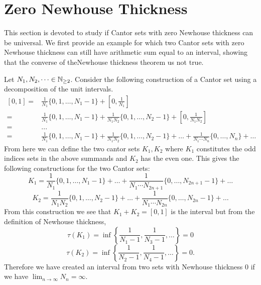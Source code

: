 \newpage
\section{Zero Newhouse Thickness} 
This section is devoted to study  if Cantor sets with zero Newhouse thickness can be universal. We first  provide an example for  which two Cantor sets with zero Newhouse thickness can still have arithmetic sum equal  to an interval,  showing that the converse of theNewhouse thickness theorem us  not true.   %
\begin{example}
{\rm Let $N_1, N_2, \dots \in \mathbb{N}_{\geq 2}$. Consider the following construction of a Cantor set using a decomposition of the unit intervals. }
$$
\begin{aligned}
[0,1] = &\frac{1}{N_1}\{0,1, \dots, N_1-1\} + \left[0,\frac{1}{N_1}\right]\\
 = & \frac{1}{N_1}\{0,1, \dots, N_1-1\} + \frac{1}{N_1 N_2}\{0,1, \dots, N_2-1\} + \left[0,\frac{1}{N_1 N_2}\right]\\
 =&...\\
 =&\frac{1}{N_1}\{0,1, \dots, N_1-1\} +  \frac{1}{N_1 N_2}\{0,1, \dots, N_2-1\} + \dots + \frac{1}{N_1 \cdots N_n} \{0,\dots, N_n \}+ \dots
\end{aligned}
$$
{\rm From here we can define the two cantor sets $K_1, K_2$ where $K_1$ constitutes the odd indices sets in the above summands and $K_2$ has the even one.   This gives the following constructions for the two Cantor sets: }
$$K_1 = \frac{1}{N_1}\{0,1, \dots, N_1-1\}  + \dots + \frac{1}{N_1 \cdots N_{2n+1}} \{0,\dots, N_{2n+1}-1 \}+ \dots$$
$$K_2 = \frac{1}{N_1N_2}\{0,1, \dots, N_2-1\}  + \dots +\frac{1}{N_1 \cdots N_{2n}} \{0,\dots, N_{2n}-1 \}+ \dots$$
{\rm From this construction we see that $K_1 + K_2 = [0,1]$ is the interval but from the definition of Newhouse thickness, }
$$\tau(K_1) = \inf \left\{\frac{1}{N_1-1}, \frac{1}{N_3-1},\dots\right\} = 0 $$
$$\tau(K_2) = \inf \left\{\frac{1}{N_2-1}, \frac{1}{N_4-1},\dots\right\} = 0.$$
{\rm Therefore we have created an interval from two sets with Newhouse thickness $0$ if we have $\lim_{n\to\infty} N_n = \infty$. }
\end{example}
\vspace{0.5cm}  

